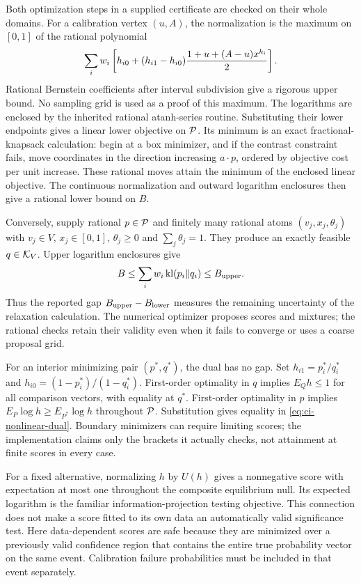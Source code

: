 Both optimization steps in a supplied certificate are checked on their whole
domains. For a calibration vertex $(u,A)$, the normalization is the maximum on
$[0,1]$ of the rational polynomial
\[
 \sum_iw_i\left[h_{i0}+(h_{i1}-h_{i0})
       {1+u+(A-u)x^{k_i}\over2}\right].
\]
Rational Bernstein coefficients after interval subdivision give a rigorous
upper bound. No sampling grid is used as a proof of this maximum.
The logarithms are enclosed by the inherited rational atanh-series routine.
Substituting their lower endpoints gives a linear lower objective on
${\cal P}$. Its minimum is an exact fractional-knapsack calculation: begin
at a box minimizer, and if the contrast constraint fails, move coordinates in
the direction increasing $a\cdot p$, ordered by objective cost per unit
increase. These rational moves attain the minimum of the enclosed linear
objective. The continuous normalization and outward logarithm enclosures then
give a rational lower bound on $B$.

Conversely, supply rational $p\in{\cal P}$ and finitely many rational atoms
$(v_j,x_j,\theta_j)$ with $v_j\in V$, $x_j\in[0,1]$, $\theta_j\ge0$ and
$\sum_j\theta_j=1$. They produce an exactly feasible $q\in{\cal K}_V$.
Upper logarithm enclosures give
\[
 B\le\sum_iw_i\operatorname{kl}(p_i\Vert q_i)\le B_{\rm upper}.
\]
Thus the reported gap $B_{\rm upper}-B_{\rm lower}$ measures the remaining
uncertainty of the relaxation calculation. The numerical optimizer proposes
scores and mixtures; the rational checks retain their validity even when it
fails to converge or uses a coarse proposal grid.

For an interior minimizing pair $(p^*,q^*)$, the dual has no gap. Set
$h_{i1}=p_i^*/q_i^*$ and
$h_{i0}=(1-p_i^*)/(1-q_i^*)$. First-order optimality in $q$ implies
$E_Qh\le1$ for all comparison vectors, with equality at $q^*$.
First-order optimality in $p$ implies
$E_P\log h\ge E_{P^*}\log h$ throughout ${\cal P}$. Substitution gives
equality in \eqref{eq:ci-nonlinear-dual}. Boundary minimizers can require
limiting scores; the implementation claims only the brackets it actually
checks, not attainment at finite scores in every case.

For a fixed alternative, normalizing $h$ by $U(h)$ gives a nonnegative score
with expectation at most one throughout the composite equilibrium null.
Its expected logarithm is the familiar information-projection testing
objective. This connection does not make a score fitted to its own data an
automatically valid significance test. Here data-dependent scores are safe
because they are minimized over a previously valid confidence region that
contains the entire true probability vector on the same event. Calibration
failure probabilities must be included in that event separately.

